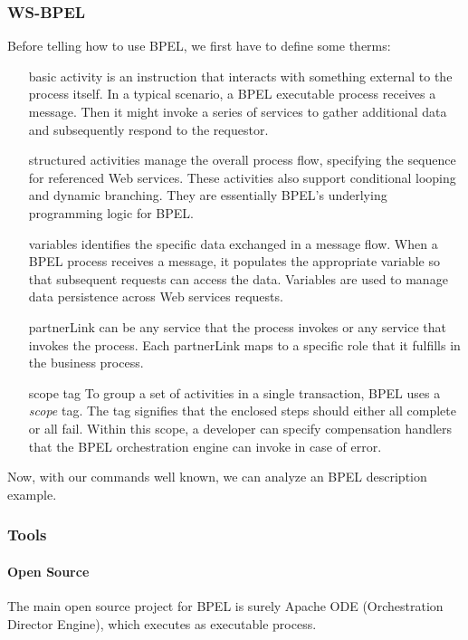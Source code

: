 \documentclass[11pt,a4paper]{article}
\begin{document}
\subsubsection{WS-BPEL}
Before telling how to use BPEL, we first have to define some therms:
\begin{itemize}
\item[basic activity] is an instruction that interacts with something external to the process itself. In a typical scenario, a BPEL executable process receives a message. Then it might invoke a series of services to gather additional data and subsequently respond to the requestor.

\item[structured activities] manage the overall process flow, specifying the sequence for referenced Web services. These activities also support conditional looping and dynamic branching. They are essentially BPEL’s underlying programming logic for BPEL. 

\item[variables] identifies the specific data exchanged in a message flow. When a BPEL process receives a message, it populates the appropriate variable so that subsequent requests can access the data. Variables are used to manage data persistence across Web services requests.

\item[partnerLink] can be any service that the process invokes or any service that invokes the process. Each partnerLink maps to a specific role that it fulfills in the business process.

\item[scope tag] To group a set of activities in a single transaction, BPEL uses a \emph{scope} tag. The tag signifies that the enclosed steps should either all complete or all fail. Within this scope, a developer can specify compensation handlers that the BPEL orchestration engine can invoke in case of error.
\end{itemize}

Now, with our commands well known, we can analyze an BPEL description example.

\subsubsection{Tools}
\paragraph{Open Source}
The main open source project for BPEL is surely Apache ODE (Orchestration Director Engine), which executes as executable process.
\end{document}

